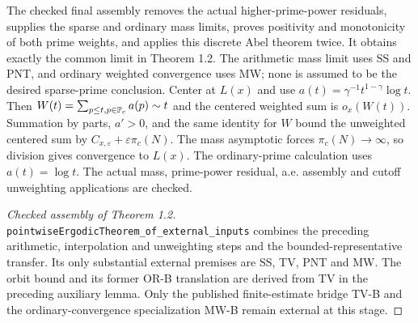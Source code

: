 The checked final assembly removes the actual higher-prime-power residuals, supplies the sparse and ordinary mass limits, proves positivity and monotonicity of both prime weights, and applies this discrete Abel theorem twice. It obtains exactly the common limit in Theorem 1.2. The arithmetic mass limit uses SS and PNT, and ordinary weighted convergence uses MW; none is assumed to be the desired sparse-prime conclusion.
\else
Center at $L(x)$ and use $a(t)=\gamma^{-1}t^{1-\gamma}\log t$. Then $W(t)=\sum_{p\leq t,p\in\mathbb P_c}a(p)\sim t$ and the centered weighted sum is $o_x(W(t))$. Summation by parts, $a'>0$, and the same identity for $W$ bound the unweighted centered sum by $C_{x,\varepsilon}+\varepsilon\pi_c(N)$. The mass asymptotic forces $\pi_c(N)\to\infty$, so division gives convergence to $L(x)$. The ordinary-prime calculation uses $a(t)=\log t$. The actual mass, prime-power residual, a.e. assembly and cutoff unweighting applications are checked.
\fi
\begin{proof}[Checked assembly of Theorem 1.2]
\leanok
\texttt{pointwiseErgodicTheorem\_\allowbreak{}of\_\allowbreak{}external\_\allowbreak{}inputs} combines the preceding arithmetic, interpolation and unweighting steps and the bounded-representative transfer. Its only substantial external premises are SS, TV, PNT and MW. The orbit bound and its former OR-B translation are derived from TV in the preceding auxiliary lemma. Only the published finite-estimate bridge TV-B and the ordinary-convergence specialization MW-B remain external at this stage.
\end{proof}



